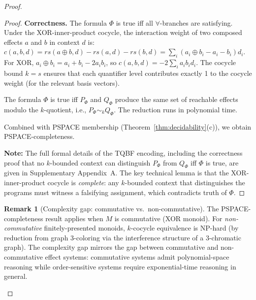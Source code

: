 \documentclass[acmsmall,sigplan,anonymous,review,screen]{acmart}
\theoremstyle{plain}
\theoremstyle{definition}
\newtheorem{remark}[theorem]{Remark}
\newcommand{\rs}{\mathit{rs}}
\begin{document}
\begin{proof}
\begin{proof}
  \medskip
  \noindent\textbf{Correctness.}
  The formula $\Phi$ is true iff all $\forall$-branches are satisfying.
  Under the XOR-inner-product cocycle, the interaction weight of two
  composed effects $a$ and $b$ in context $d$ is:
  $c(a, b, d) = \rs(a \oplus b, d) - \rs(a, d) - \rs(b, d)
  = \sum_i (a_i \oplus b_i - a_i - b_i) d_i$.
  For XOR, $a_i \oplus b_i = a_i + b_i - 2 a_i b_i$, so
  $c(a, b, d) = -2\sum_i a_i b_i d_i$.
  The cocycle bound $k = s$ ensures that each quantifier level contributes
  exactly 1 to the cocycle weight (for the relevant basis vectors).

  The formula $\Phi$ is true iff $P_\Phi$ and $Q_\Phi$ produce the same
  set of reachable effects modulo the $k$-quotient, i.e., $P_\Phi \sim_k Q_\Phi$.
  The reduction runs in polynomial time.

  \medskip
  Combined with PSPACE membership (Theorem~\ref{thm:decidability}(c)),
  we obtain PSPACE-completeness.

  \medskip
  \textbf{Note:} The full formal details of the TQBF encoding, including
  the correctness proof that no $k$-bounded context can distinguish
  $P_\Phi$ from $Q_\Phi$ iff $\Phi$ is true, are given in
  Supplementary Appendix~A.  The key technical lemma is that the
  XOR-inner-product cocycle is \emph{complete}: any $k$-bounded context
  that distinguishes the programs must witness a falsifying assignment,
  which contradicts truth of $\Phi$.
\end{proof}

\begin{remark}[Complexity gap: commutative vs.\ non-commutative]
  The PSPACE-completeness result applies when $M$ is commutative (XOR monoid).
  For \emph{non-commutative} finitely-presented monoids, $k$-cocycle
  equivalence is NP-hard (by reduction from graph 3-coloring via the
  interference structure of a 3-chromatic graph).  The complexity gap
  mirrors the gap between commutative and non-commutative effect systems:
  commutative systems admit polynomial-space reasoning while
  order-sensitive systems require exponential-time reasoning in general.
\end{remark}


\end{proof}
\end{document}
